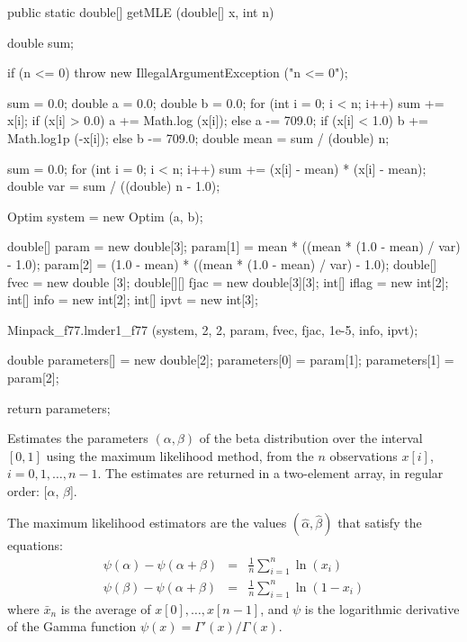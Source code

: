 \begin{code}

   public static double[] getMLE (double[] x, int n)\begin{hide} {
      double sum;

      if (n <= 0)
         throw new IllegalArgumentException ("n <= 0");

      sum = 0.0;
      double a = 0.0;
      double b = 0.0;
      for (int i = 0; i < n; i++)
      {
         sum += x[i];
         if (x[i] > 0.0)
            a += Math.log (x[i]);
         else
            a -= 709.0;
         if (x[i] < 1.0)
            b += Math.log1p (-x[i]);
         else
            b -= 709.0;
      }
      double mean = sum / (double) n;

      sum = 0.0;
      for (int i = 0; i < n; i++)
         sum += (x[i] - mean) * (x[i] - mean);
      double var = sum / ((double) n - 1.0);

      Optim system = new Optim (a, b);

      double[] param = new double[3];
      param[1] = mean * ((mean * (1.0 - mean) / var) - 1.0);
      param[2] = (1.0 - mean) * ((mean * (1.0 - mean) / var) - 1.0);
      double[] fvec = new double [3];
      double[][] fjac = new double[3][3];
      int[] iflag = new int[2];
      int[] info = new int[2];
      int[] ipvt = new int[3];

      Minpack_f77.lmder1_f77 (system, 2, 2, param, fvec, fjac, 1e-5, info, ipvt);

      double parameters[] = new double[2];
      parameters[0] = param[1];
      parameters[1] = param[2];

      return parameters;
   }\end{hide}
\end{code}
\begin{tabb}
   Estimates the parameters $(\alpha,\beta)$ of the beta distribution over the
  interval $[0,1]$ using the maximum likelihood method, from the $n$ observations
   $x[i]$, $i = 0, 1,\ldots, n-1$. The estimates are returned in a two-element
    array, in regular order: [$\alpha$, $\beta$].
   \begin{detailed}
   The maximum likelihood estimators are the values $(\hat\alpha, \hat\beta)$
   that satisfy the equations:
   \begin{eqnarray*}
      \psi(\alpha) - \psi(\alpha + \beta) & = & \frac1n \sum_{i=1}^{n} \ln(x_i)\\
      \psi(\beta) - \psi(\alpha + \beta) & = & \frac1n \sum_{i=1}^{n} \ln(1 - x_i)
   \end{eqnarray*}
   where $\bar x_n$ is the average of $x[0],\dots,x[n-1]$, and
   $\psi$ is the logarithmic derivative of the Gamma function
   $\psi(x) = \Gamma'(x) / \Gamma(x)$.
   \end{detailed}
\end{tabb}
